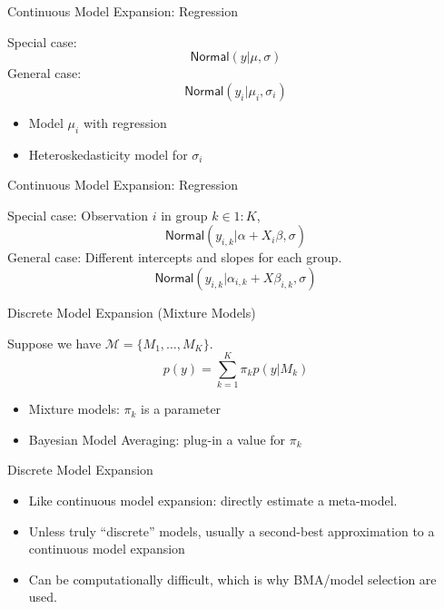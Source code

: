 \documentclass[ignorenonframetext,]{beamer}
\providecommand{\tightlist}{%
  \setlength{\itemsep}{0pt}\setlength{\parskip}{0pt}}
\begin{document}
\begin{frame}{Continuous Model Expansion: Regression}
\protect\hypertarget{continuous-model-expansion-regression}{}

Special case: \[
\mathsf{Normal}(y| \mu, \sigma)
\] General case: \[
\mathsf{Normal}(y_i| \mu_i, \sigma_i)
\]

\begin{itemize}
\tightlist
\item
  Model \(\mu_i\) with regression
\item
  Heteroskedasticity model for \(\sigma_i\)
\end{itemize}

\end{frame}

\begin{frame}{Continuous Model Expansion: Regression}
\protect\hypertarget{continuous-model-expansion-regression-1}{}

Special case: Observation \(i\) in group \(k \in 1:K\), \[
\mathsf{Normal}(y_{i,k}|\alpha + X_i \beta, \sigma)
\] General case: Different intercepts and slopes for each group. \[
\mathsf{Normal}(y_{i,k}|\alpha_{i,k} + X \beta_{i,k}, \sigma)
\]

\end{frame}

\begin{frame}{Discrete Model Expansion (Mixture Models)}
\protect\hypertarget{discrete-model-expansion-mixture-models}{}

Suppose we have \(\mathcal{M} = \{M_1, \dots, M_K\}\). \[
p(y) = \sum_{k = 1}^{K} \pi_k  p(y | M_k)
\]

\begin{itemize}
\tightlist
\item
  Mixture models: \(\pi_{k}\) is a parameter
\item
  Bayesian Model Averaging: plug-in a value for \(\pi_{k}\)
\end{itemize}

\end{frame}

\begin{frame}{Discrete Model Expansion}
\protect\hypertarget{discrete-model-expansion}{}

\begin{itemize}
\tightlist
\item
  Like continuous model expansion: directly estimate a meta-model.
\item
  Unless truly “discrete” models, usually a second-best approximation to
  a continuous model expansion
\item
  Can be computationally difficult, which is why BMA/model selection are
  used.
\end{itemize}

\end{frame}
\end{document}
